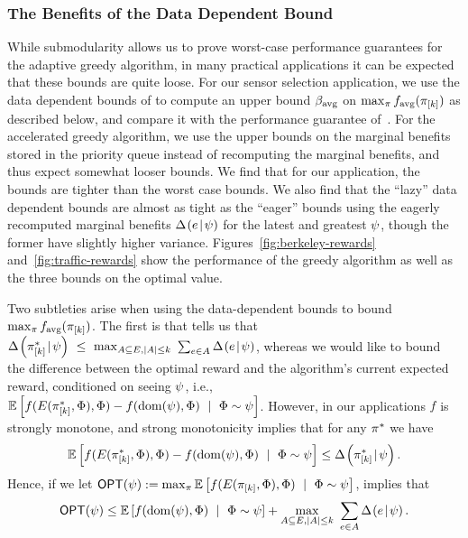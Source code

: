 \subsubsection{The Benefits of the Data Dependent Bound}
While \term submodularity allows us to prove worst-case performance
guarantees for the adaptive greedy algorithm, in many practical
applications it can be expected that these bounds are quite loose.
For our sensor selection application, we use the data dependent
bounds of  to compute an upper bound
$\beta_{\text{avg}}$ on $\max_{\pi} f_{\text{avg}}( \pi_{[{k}]} )$ as described below,
and compare it with the performance guarantee
of~. 
%
For the accelerated greedy algorithm, we use the upper bounds on the
marginal benefits stored in the priority queue instead of recomputing
the marginal benefits, and thus expect somewhat looser bounds. We find
that for our application, the bounds are tighter than the worst
case bounds. We also find that the ``lazy'' data dependent bounds are
almost as tight as the ``eager'' bounds using the 
eagerly recomputed marginal benefits $\Delta \hspace{-0.3mm} \left( { {e}\! \mid \! {{\color{black}{\ensuremath{\psi}}}} } \right)  $  for the latest and
greatest ${\color{black}{\ensuremath{\psi}}}$, though the former have slightly higher variance.  
Figures~\ref{fig:berkeley-rewards} and~\ref{fig:traffic-rewards} show the
performance of the greedy algorithm as well as the three bounds on the
optimal value.


Two subtleties arise when using the data-dependent bounds 
to bound $\max_{\pi} f_{\text{avg}}( \pi_{[{k}]} )$.
The first is that  tells us that  
$\Delta \hspace{-0.3mm} \left( { { \pi^*_{[{k}]} }\! \mid \! {{\color{black}{\ensuremath{\psi}}}} } \right)   \ \le \ \max_{A \subseteq E, |A| \le
  k} \ \sum_{e \in A} \Delta \hspace{-0.3mm} \left( { {e}\! \mid \! {{\color{black}{\ensuremath{\psi}}}} } \right)  $, whereas we would like to bound
the difference between
the optimal reward and 
the algorithm's current expected reward, conditioned on seeing
${\color{black}{\ensuremath{\psi}}}$, i.e., $\mathbb{E}\left[f(E({ \pi^*_{[{k}]} }, {{\color{black}{\ensuremath{\Phi}}}}), {\color{black}{\ensuremath{\Phi}}})  -
  f(\operatorname{dom}({\color{black}{\ensuremath{\psi}}}), {\color{black}{\ensuremath{\Phi}}}) \ \mid \ {\color{black}{\ensuremath{\Phi}}} \sim {\color{black}{\ensuremath{\psi}}}  \right]$.
However, in our applications $f$ is strongly \term monotone, and strong
\term monotonicity implies that for any $\pi^*$ we have 
\begin{equation}
  \label{eq:experiments1}
  \mathbb{E}\left[f(E({ \pi^*_{[{k}]} }, {{\color{black}{\ensuremath{\Phi}}}}), {\color{black}{\ensuremath{\Phi}}})  -
  f(\operatorname{dom}({\color{black}{\ensuremath{\psi}}}), {\color{black}{\ensuremath{\Phi}}}) \ \mid \ {\color{black}{\ensuremath{\Phi}}} \sim {\color{black}{\ensuremath{\psi}}}  \right] \le \Delta \hspace{-0.3mm} \left( { { \pi^*_{[{k}]} }\! \mid \! {{\color{black}{\ensuremath{\psi}}}} } \right)  . 
\end{equation}
Hence, if we let $\textsf{OPT}({\color{black}{\ensuremath{\psi}}}) := \max_{\pi}
\mathbb{E}\left[f(E({ \pi_{[{k}]} }, {{\color{black}{\ensuremath{\Phi}}}}), {\color{black}{\ensuremath{\Phi}}}) \ \mid \ {\color{black}{\ensuremath{\Phi}}} \sim
  {\color{black}{\ensuremath{\psi}}}\right]$, 
  implies that 
\begin{equation}
  \label{eq:experiments2}
 \textsf{OPT}({\color{black}{\ensuremath{\psi}}})  \le  \mathbb{E}\left[f(\operatorname{dom}({\color{black}{\ensuremath{\psi}}}), {\color{black}{\ensuremath{\Phi}}}) \ \mid \ {\color{black}{\ensuremath{\Phi}}} \sim
   {\color{black}{\ensuremath{\psi}}}\right] + \max_{A \subseteq E, |A| \le
  k} \ \sum_{e \in A} \Delta \hspace{-0.3mm} \left( { {e}\! \mid \! {{\color{black}{\ensuremath{\psi}}}} } \right)  . 
\end{equation}
 

